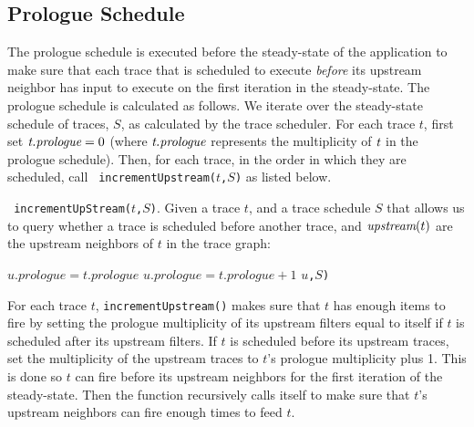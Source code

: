 
\subsection{Prologue Schedule}
\label{sec:prologue}
The prologue schedule is executed before the steady-state of the
application to make sure that each trace that is scheduled to execute
{\it before} its upstream neighbor has input to execute on the first
iteration in the steady-state.  The prologue schedule is calculated as
follows.  We iterate over the steady-state schedule of traces, $S$, as
calculated by the trace scheduler.  For each trace $t$, first set
$\mbox{\it t.prologue} = 0$ (where $\mbox{\it t.prologue}$ represents the
multiplicity of $\mbox{\it t}$ in the prologue schedule).  Then, for each
trace, in the order in which they are scheduled, call {\tt
incrementUpstream(}$t${\tt,}$S${\tt )} as listed below.

\begin{algorithm}
\caption{IncrementUpstream} \label{alg:incrementUpstream} {\tt
incrementUpStream(}$t${\tt ,}$S${\tt )}. Given a trace $t$, and a
trace schedule $S$ that allows us to query whether a trace is
scheduled before another trace, and $\mbox{\it upstream}(t)$ are the
upstream neighbors of $t$ in the trace graph:
\begin{algorithmic}
\STATE $u.prologue = t.prologue$
\ELSE
\STATE $u.prologue = t.prologue + 1$ 
\ENDIF 
{}$u${\tt ,}$S${\tt )}
\ENDFOR
\end{algorithmic}
\end{algorithm}

For each trace $t$, {\tt incrementUpstream()} makes sure that $t$ has
enough items to fire by setting the prologue multiplicity of its
upstream filters equal to itself if $t$ is scheduled after its
upstream filters.  If $t$ is scheduled before its upstream traces, set
the multiplicity of the upstream traces to $t$'s prologue multiplicity
plus 1.  This is done so $t$ can fire before its upstream neighbors
for the first iteration of the steady-state.  Then the function
recursively calls itself to make sure that $t$'s upstream neighbors
can fire enough times to feed $t$.
